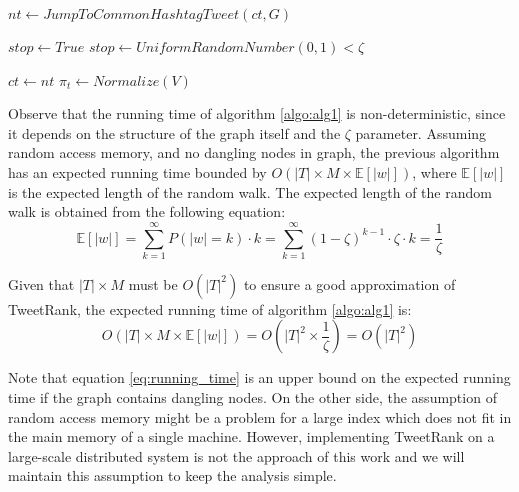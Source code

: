 \begin{algorithm}
{\begin{algorithmic}
\STATE $nt \leftarrow JumpToCommonHashtagTweet(ct, G)$  
\ENDIF

\STATE $stop \leftarrow True$ 
\ELSE
\STATE $stop \leftarrow UniformRandomNumber(0,1) < \zeta$ 
\ENDIF

\STATE $ct \leftarrow nt$ 
\ENDWHILE
\ENDFOR
\ENDFOR
\STATE $\pi_t \leftarrow Normalize(V)$ 
\end{algorithmic}}
\end{algorithm}

Observe that the running time of algorithm \ref{algo:alg1} is non-deterministic, since it depends on the structure of the graph itself and the $\zeta$ parameter. Assuming random access memory, and no dangling nodes in graph, the previous algorithm has an expected running time bounded by $O(|T| \times M \times \mathbb{E}[|w|])$, where $\mathbb{E}[|w|]$ is the expected length of the random walk. The expected length of the random walk is obtained from the following
equation:
\begin{equation}
\mathbb{E}[|w|] = \sum_{k=1}^{\infty} P(|w| = k) \cdot k = \sum_{k=1}^{\infty} (1 - \zeta)^{k-1} \cdot \zeta \cdot k = \frac{1}{\zeta}
\end{equation}

Given that $|T| \times M$ must be $O(|T|^ 2)$ to ensure a good approximation of TweetRank, the expected running time of algorithm \ref{algo:alg1} is:
\begin{equation}\label{eq:running_time}
O(|T| \times M \times \mathbb{E}[|w|]) = O(|T|^2 \times \frac{1}{\zeta}) = O(|T|^2)
\end{equation}

Note that equation \ref{eq:running_time} is an upper bound on the expected running time if the graph contains dangling nodes. On the other side, the assumption of random access memory might be a problem for a large index which does not fit in the main memory of a single machine. However, implementing TweetRank on a large-scale distributed system is not the approach of this work and we will maintain this assumption to keep the analysis simple.